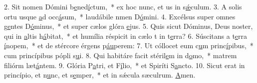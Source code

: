 2. Sit nomen Dómini b\uline{e}ned\uline{í}ctum,~* ex hoc nunc, et us in s\uline{ǽ}culum.
3. A solis ortu usque \uline{a}d occ\uline{á}sum,~* laudábile nmen D\uline{ó}mini.
4. Excélsus super omnes g\uline{e}ntes D\uline{ó}minus,~* et super cælos glóra \uline{e}jus.
5. Quis sicut Dóminus, Deus noster, qui in \uline{a}ltis h\uline{á}bitat,~* et humília réspicit in cælo t in t\uline{e}rra?
6. Súscitans a t\uline{e}rra \uline{í}nopem,~* et de stércore érgens p\uline{áu}perem:
7. Ut cóllocet eum c\uline{u}m princ\uline{í}pibus,~* cum princípibus pópli s\uline{u}i.
8. Qui habitáre facit stéril\uline{e}m in d\uline{o}mo,~* matrem filiórm læt\uline{á}ntem.
9. Glória P\uline{a}tri, et F\uline{í}lio,~* et Spiríti S\uline{a}ncto.
10. Sicut erat in princípio, et n\uline{u}nc, et s\uline{e}mper,~* et in sǽcula sæculrum. \uline{A}men.
